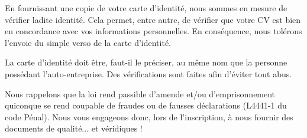 En fournissant une copie de votre carte d'identité, nous sommes en mesure de vérifier ladite identité.
Cela permet, entre autre, de vérifier que votre CV est bien en concordance avec vos informations personnelles.
En conséquence, nous tolérons l'envoie du simple verso de la carte d'identité.

La carte d'identité doit être, faut-il le préciser, au même nom que la personne possédant l'auto-entreprise. Des vérifications sont faites afin d'éviter tout abus.

Nous rappelons que la loi rend passible d'amende et/ou d'emprisonnement quiconque se rend coupable de fraudes ou de fausses déclarations (L4441-1 du code Pénal). Nous vous engageons donc, lors de l'inscription, à nous fournir des documents de qualité... et véridiques !